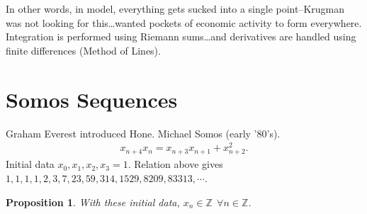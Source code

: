 \documentclass[12pt,reqno]{amsart}
\numberwithin{equation}{section}  %
\newcommand{\zz}{\mathbb{Z}}
\newtheorem{proposition}[theorem]{Proposition}
\begin{document}
%
%
  In other words, in model, everything gets sucked into a single point--Krugman
  was not looking for this\ldots wanted pockets of economic activity to form
  everywhere. Integration is performed using Riemann sums\ldots and derivatives
  are handled using finite differences (Method of Lines). 
%
%
%
%
%
%
%
%
%
  \section{Somos Sequences} 
  \label{sec:somos}
  Graham Everest introduced Hone. Michael Somos (early '80's). 
%
%
  \begin{equation*}
    \begin{split}
      x_{n+4}x_{n} = x_{n+3}x_{n+1} + x_{n+2}^{2}.
    \end{split}
  \end{equation*}
%
%
  Initial data $x_{0}, x_{1}, x_{2}, x_{3} =1$. Relation above gives
  \\ $1,1,1,1,2,3,7,23,59,314,1529,8209,83313,\cdots$. 
%
%
%
%
%
%                
%
%
%
%
  \begin{proposition}
    With these initial data, $x_{n} \in \zz \ \ \forall n \in \zz$. 
    \label{prop:somos}
  \end{proposition}
%
%
\end{document}
